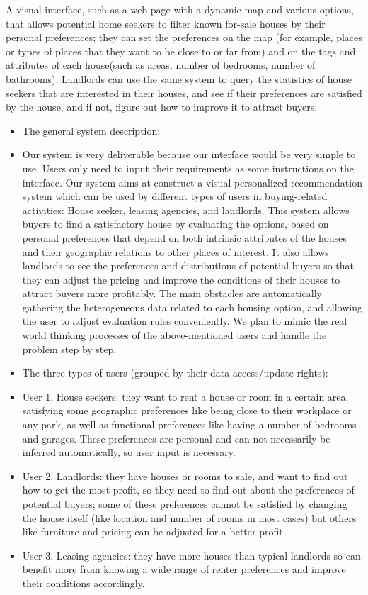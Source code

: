 \textnormal{
A visual interface, such as a web page with a dynamic map and various options, that allows potential home seekers to filter known for-sale houses by their personal preferences; they can set the preferences on the map (for example, places or types of places that they want to be close to or far from) and on the tags and attributes of each house(such as areas, number of bedrooms, number of bathrooms). Landlords can use the same system to query the statistics of house seekers that are interested in their houses, and see if their preferences are satisfied by the house, and if not, figure out how to improve it to attract buyers.
} 




\begin{itemize} 
\item{The general system description: } 
	\item{
Our system is very deliverable because our interface would be very simple to use. Users only need to input their requirements as some instructions on the interface.
Our system aims at construct a visual personalized recommendation system which can be used by different types of users in buying-related activities: House seeker, leasing agencies, and landlords. This system allows buyers to find a satisfactory house by evaluating the options, based on personal preferences that depend on both intrinsic attributes of the houses and their geographic relations to other places of interest. It also allows landlords to see the preferences and distributions of potential buyers so that they can adjust the pricing and improve the conditions of their houses to attract buyers more profitably. The main obstacles are automatically gathering the heterogeneous data related to each housing option, and allowing the user to adjust evaluation rules conveniently. We plan to mimic the real world thinking processes of the above-mentioned users and handle the problem step by step.}
\item{The three types of users (grouped by their data access/update rights): }
	\item{
User 1. House seekers: they want to rent a house or room in a certain area, satisfying some geographic preferences like being close to their workplace or any park, as well as functional preferences like having a number of bedrooms and garages. These preferences are personal and can not necessarily be inferred automatically, so user input is necessary.}
	\item{
User 2. Landlords: they have houses or rooms to sale, and want to find out how to get the most profit, so they need to find out about the preferences of potential buyers; some of these preferences cannot be satisfied by changing the house itself (like location and number of rooms in most cases) but others like furniture and pricing can be adjusted for a better profit.}
	\item{
User 3. Leasing agencies: they have more houses than typical landlords so can benefit more from knowing a wide range of renter preferences and improve their conditions accordingly.}


\end{itemize}
